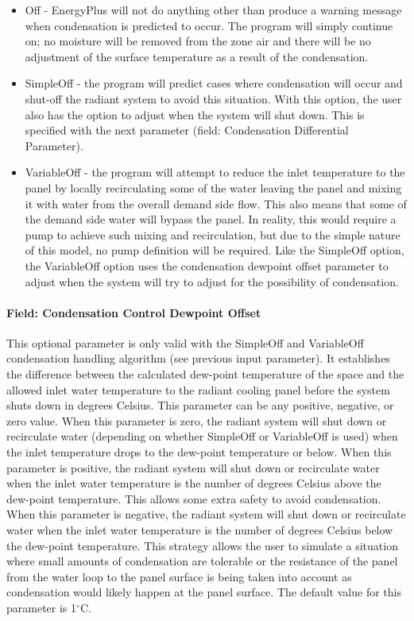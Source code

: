 \begin{itemize}
\item
  Off - EnergyPlus will not do anything other than produce a warning message when condensation is predicted to occur. The program will simply continue on; no moisture will be removed from the zone air and there will be no adjustment of the surface temperature as a result of the condensation.
\item
  SimpleOff - the program will predict cases where condensation will occur and shut-off the radiant system to avoid this situation. With this option, the user also has the option to adjust when the system will shut down. This is specified with the next parameter (field: Condensation Differential Parameter).
\item
  VariableOff - the program will attempt to reduce the inlet temperature to the panel by locally recirculating some of the water leaving the panel and mixing it with water from the overall demand side flow.  This also means that some of the demand side water will bypass the panel. In reality, this would require a pump to achieve such mixing and recirculation, but due to the simple nature of this model, no pump definition will be required. Like the SimpleOff option, the VariableOff option uses the condensation dewpoint offset parameter to adjust when the system will try to adjust for the possibility of condensation.
\end{itemize}

\paragraph{Field: Condensation Control Dewpoint Offset}

This optional parameter is only valid with the SimpleOff and VariableOff condensation handling algorithm (see previous input parameter). It establishes the difference between the calculated dew-point temperature of the space and the allowed inlet water temperature to the radiant cooling panel before the system shuts down in degrees Celsius. This parameter can be any positive, negative, or zero value. When this parameter is zero, the radiant system will shut down or recirculate water (depending on whether SimpleOff or VariableOff is used) when the inlet temperature drops to the dew-point temperature or below. When this parameter is positive, the radiant system will shut down or recirculate water when the inlet water temperature is the number of degrees Celsius above the dew-point temperature. This allows some extra safety to avoid condensation. When this parameter is negative, the radiant system will shut down or recirculate water when the inlet water temperature is the number of degrees Celsius below the dew-point temperature. This strategy allows the user to simulate a situation where small amounts of condensation are tolerable or the resistance of the panel from the water loop to the panel surface is being taken into account as condensation would likely happen at the panel surface. The default value for this parameter is 1$^\circ$C.

